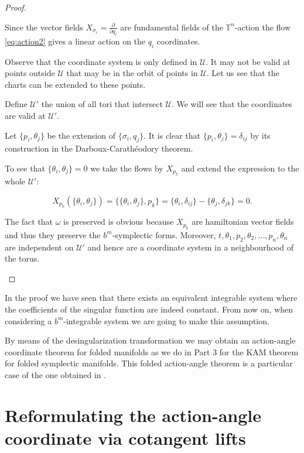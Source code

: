 \begin{proof}
\begin{enumerate}
Since the vector fields $X_{\sigma_i} = \frac{\partial}{\partial q_i}$ are fundamental fields of the $\mathbb{T}^n$-action the flow \ref{eq:action2} gives a linear action on the $q_i$ coordinates.

Observe that the coordinate system is only defined in $\mathcal{U}$. It may not be valid at points outside $\mathcal{U}$ that may be in the orbit of points in $\mathcal{U}$. Let us see that the charts can be extended to these points.

Define $\mathcal{U}'$ the union of all tori that intersect $\mathcal{U}$.
We will see that the coordinates are valid at $\mathcal{U}'$.

Let $\{p_i,\theta_j\}$ be the extension of $\{\sigma_i,q_j\}$. It is clear that $\{p_i,\theta_j\} = \delta_{ij}$ by its construction in the Darboux-Carathéodory theorem.

To see that $\{\theta_i,\theta_j\} = 0$ we take the flows by $X_{p_k}$ and extend the expression to the whole $\mathcal{U}'$:

$$X_{p_k}(\{\theta_i, \theta_j\}) = \{\{\theta_i, \theta_j\},p_k\} = \{\theta_i,\delta_{ij}\} - \{\theta_j, \delta_{jk}\} = 0.$$

The fact that $\omega$ is preserved is obvious because $X_{p_k}$ are hamiltonian vector fields and thus they preserve the $b^m$-symplectic forms. Moreover, $t,\theta_1,p_2,\theta_2,\ldots,p_n,\theta_n$ are independent on $\mathcal{U}'$ and hence are a coordinate system in a neighbourhood of the torus.

\end{enumerate}
\end{proof}

\begin{remark}
In the proof  we have seen that there exists an equivalent integrable system where the coefficients of the singular function are indeed constant. From now on, when considering a $b^m$-integrable system we are going to make this assumption.
\end{remark}

\begin{remark}
    By means of the desingularization transformation we may obtain an action-angle coordinate theorem for folded manifolds as we do in Part 3 for the KAM theorem for folded symplectic manifolds. This folded action-angle theorem is a particular case of the one obtained in \cite{EvaRobert}.
\end{remark}

\chapter[Action-angle coordinates and cotangent lifts]{Reformulating the action-angle coordinate via cotangent lifts}

